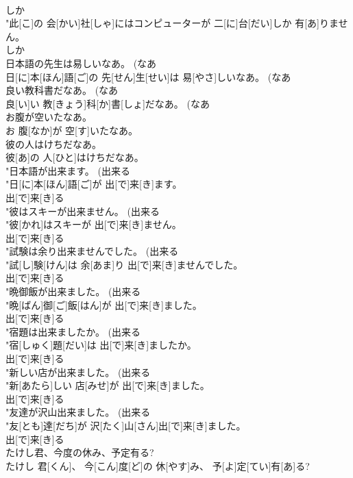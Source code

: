 \documentclass[8pt]{extreport}
\begin{document}
\begin{CJK}{UTF8}{min}
\\	しか 
\\	"此[こ]の 会[かい]社[しゃ]にはコンピューターが 二[に]台[だい]しか 有[あ]りません。 
\\	しか 
\\	日本語の先生は易しいなあ。 (なあ 
\\	日[に]本[ほん]語[ご]の 先[せん]生[せい]は 易[やさ]しいなあ。 (なあ 
\\	良い教科書だなあ。 (なあ 
\\	良[い]い 教[きょう]科[か]書[しょ]だなあ。 (なあ 
\\	お腹が空いたなあ。	
\\	お 腹[なか]が 空[す]いたなあ。
\\	彼の人はけちだなあ。	
\\	彼[あ]の 人[ひと]はけちだなあ。
\\	"日本語が出来ます。 (出来る 
\\	"日[に]本[ほん]語[ご]が 出[で]来[き]ます。 
\\	出[で]来[き]る 
\\	"彼はスキーが出来ません。 (出来る 
\\	"彼[かれ]はスキーが 出[で]来[き]ません。 
\\	出[で]来[き]る 
\\	"試験は余り出来ませんでした。 (出来る 
\\	"試[し]験[けん]は 余[あま]り 出[で]来[き]ませんでした。 
\\	出[で]来[き]る 
\\	"晩御飯が出来ました。 (出来る 
\\	"晩[ばん]御[ご]飯[はん]が 出[で]来[き]ました。 
\\	出[で]来[き]る 
\\	"宿題は出来ましたか。 (出来る 
\\	"宿[しゅく]題[だい]は 出[で]来[き]ましたか。 
\\	出[で]来[き]る 
\\	"新しい店が出来ました。 (出来る 
\\	"新[あたら]しい 店[みせ]が 出[で]来[き]ました。 
\\	出[で]来[き]る 
\\	"友達が沢山出来ました。 (出来る 
\\	"友[とも]達[だち]が 沢[たく]山[さん]出[で]来[き]ました。 
\\	出[で]来[き]る 
\\	たけし君、今度の休み、予定有る?	
\\	たけし 君[くん]、 今[こん]度[ど]の 休[やす]み、 予[よ]定[てい]有[あ]る?

\end{CJK}
\end{document}
